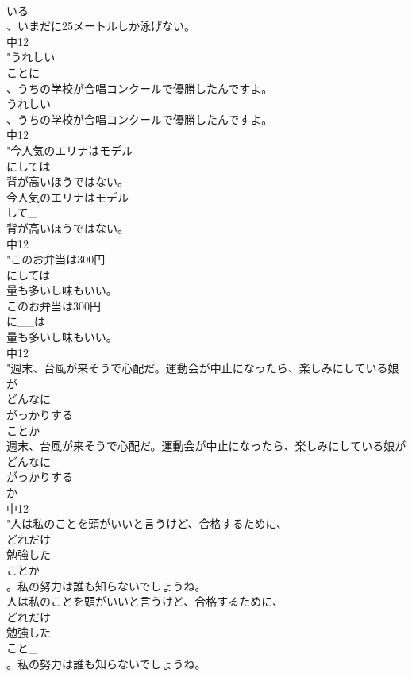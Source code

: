 \documentclass[8pt]{extreport}
\begin{document}
\begin{CJK}{UTF8}{min}
\\	いる
\\	、いまだに25メートルしか泳げない。
\\	中12
\\	"うれしい
\\	ことに
\\	、うちの学校が合唱コンクールで優勝したんですよ。
\\	うれしい
\\	、うちの学校が合唱コンクールで優勝したんですよ。
\\	中12
\\	"今人気のエリナはモデル
\\	にしては
\\	背が高いほうではない。
\\	今人気のエリナはモデル
\\	して_
\\	背が高いほうではない。
\\	中12
\\	"このお弁当は300円
\\	にしては
\\	量も多いし味もいい。
\\	このお弁当は300円
\\	に__は
\\	量も多いし味もいい。
\\	中12
\\	"週末、台風が来そうで心配だ。運動会が中止になったら、楽しみにしている娘が
\\	どんなに
\\	がっかりする
\\	ことか
\\	週末、台風が来そうで心配だ。運動会が中止になったら、楽しみにしている娘が
\\	どんなに
\\	がっかりする
\\	か
\\	中12
\\	"人は私のことを頭がいいと言うけど、合格するために、
\\	どれだけ
\\	勉強した
\\	ことか
\\	。私の努力は誰も知らないでしょうね。
\\	人は私のことを頭がいいと言うけど、合格するために、
\\	どれだけ
\\	勉強した
\\	こと_
\\	。私の努力は誰も知らないでしょうね。

\end{CJK}
\end{document}
